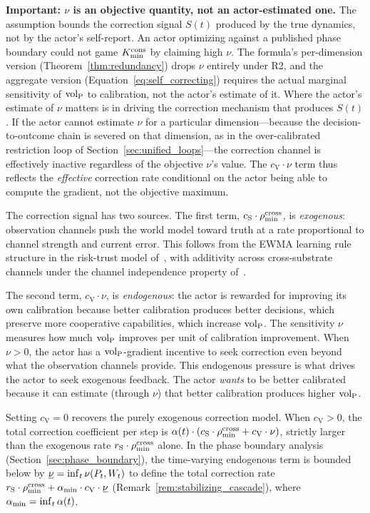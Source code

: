 \textbf{Important: $\nu$ is an objective quantity, not an
actor-estimated one.}  The assumption bounds the correction signal
$S(t)$ produced by the true dynamics, not by the actor's
self-report.  An actor optimizing against a published phase boundary
could not game $K_{\mathrm{min}}^{\mathrm{cons}}$ by claiming high $\nu$.  The formula's
per-dimension version (Theorem~\ref{thm:redundancy}) drops $\nu$
entirely under R2, and the aggregate version
(Equation~\ref{eq:self_correcting}) requires the actual marginal
sensitivity of ${\operatorname{vol}_{\mathrm{P}}}$ to calibration, not the actor's estimate of
it.  Where the actor's estimate of $\nu$ matters is in driving the
correction mechanism that produces $S(t)$.  If the actor cannot
estimate $\nu$ for a particular dimension---because the
decision-to-outcome chain is severed on that dimension, as in the
over-calibrated restriction loop of
Section~\ref{sec:unified_loops}---the correction channel is
effectively inactive regardless of the objective $\nu$'s value.
The $c_{\mathrm{V}} \cdot \nu$ term thus reflects the \emph{effective}
correction rate conditional on the actor being able to compute the
gradient, not the objective maximum.

The correction signal has two sources.  The first term,
$c_{\mathrm{S}} \cdot \rho_{\min}^{\mathrm{cross}}$, is \emph{exogenous}: observation
channels push the world model toward truth at a rate proportional to
channel strength and current error.  This follows from the EWMA
learning rule~\citep{wald1947sequential} structure in the risk-trust
model of~\citet{lasser2026scm}, with
additivity across cross-substrate channels under the channel
independence property of~\citet{lasser2026exo}.

The second term, $c_{\mathrm{V}} \cdot \nu$, is \emph{endogenous}: the
actor is rewarded for improving its own calibration because better
calibration produces better decisions, which preserve more cooperative
capabilities, which increase ${\operatorname{vol}_{\mathrm{P}}}$.  The sensitivity $\nu$ measures
how much ${\operatorname{vol}_{\mathrm{P}}}$ improves per unit of calibration improvement.  When
$\nu > 0$, the actor has a ${\operatorname{vol}_{\mathrm{P}}}$-gradient incentive to seek
correction even beyond what the observation channels provide.  This
endogenous pressure is what drives the actor to seek exogenous
feedback.  The actor \emph{wants} to be better calibrated because it
can estimate (through $\nu$) that better calibration produces higher
${\operatorname{vol}_{\mathrm{P}}}$.

Setting $c_{\mathrm{V}} = 0$ recovers the purely exogenous correction
model.  When $c_{\mathrm{V}} > 0$, the total correction coefficient
per step is $\alpha(t) \cdot (c_{\mathrm{S}} \cdot \rho_{\min}^{\mathrm{cross}} +
c_{\mathrm{V}} \cdot \nu)$, strictly larger than the exogenous
rate $r_{\mathrm{S}} \cdot \rho_{\min}^{\mathrm{cross}}$ alone.  In the phase boundary analysis
(Section~\ref{sec:phase_boundary}), the time-varying endogenous term
is bounded below by $\underline{\nu} = \inf_t \nu(P_t, W_t)$ to
define the total correction rate $r_{\mathrm{S}} \cdot \rho_{\min}^{\mathrm{cross}} +
\alpha_{\min} \cdot c_{\mathrm{V}} \cdot \underline{\nu}$
(Remark~\ref{rem:stabilizing_cascade}), where
$\alpha_{\min} = \inf_t \alpha(t)$.

